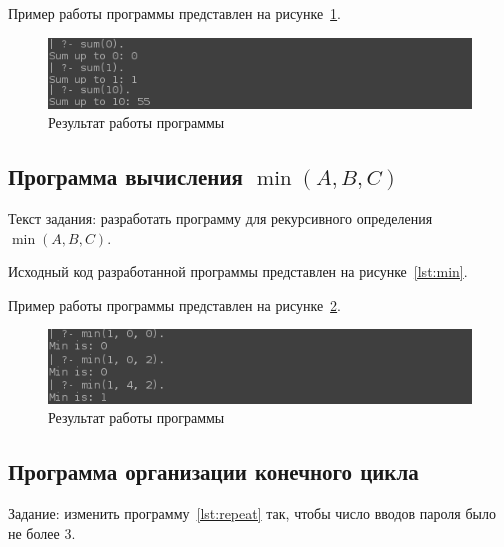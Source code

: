 

Пример работы программы представлен на рисунке~\ref{fig:sum}.

\begin{figure}[h!]
  \centering
  \includegraphics[width=150mm]{img/sum}
  \caption{Результат работы программы}
  \label{fig:sum}
\end{figure}


\pagebreak
\subsection{Программа вычисления \( \min(A, B, C) \)}

Текст задания: разработать программу для рекурсивного определения 
\( \min(A, B, C) \).

Исходный код разработанной программы представлен на
рисунке~\ref{lst:min}.



Пример работы программы представлен на рисунке~\ref{fig:min}.

\begin{figure}[h!]
  \centering
  \includegraphics[width=150mm]{img/min}
  \caption{Результат работы программы}
  \label{fig:min}
\end{figure}


\pagebreak
\subsection{Программа организации конечного цикла}

Задание: изменить программу~\ref{lst:repeat} так,
чтобы число вводов пароля было не более 3.

